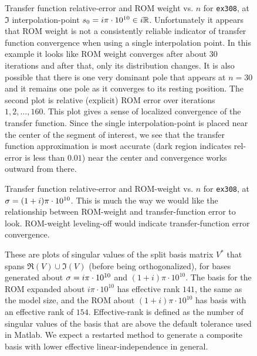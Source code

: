 \begin{figure}
\centering
{}
\caption{\label{fig:308benchmark2} Transfer function relative-error and ROM weight vs. $n$ for \texttt{ex308}, at $\Im$ interpolation-point $s_0 = i \pi\cdot10^{10}\in i \mathbb{R}$.   Unfortunately it appears that ROM weight is not
a consistently reliable indicator of transfer function convergence when using a single interpolation point.   In this example it looks like ROM weight converges after about 30 iterations and after that, only its distribution changes. It is also possible that there is one very dominant pole that appears at $n=30$ and it remains one pole as it converges to its resting position.
The second plot is relative (explicit) ROM error over iterations $1,2,\ldots,160$.  This plot gives a sense of localized convergence of the transfer function.  Since the single interpolation-point is placed near the center of the segment of interest, we see that the transfer function approximation is most accurate (dark region indicates rel-error is less than $0.01$) near the center and convergence works outward from there.}
\end{figure}

\begin{figure}
\caption{\label{fig:308benchmark3} Transfer function relative-error and ROM-weight vs. $n$ for \texttt{ex308}, at $\sigma = (1+i)\pi\cdot10^{10}$.   This is much the way we would like the relationship between ROM-weight and transfer-function error to look.    ROM-weight leveling-off would indicate transfer-function error convergence.}
\end{figure}


\begin{figure}
\centering
{}
\caption{ \label{fig:308singsvd}These are plots of singular values of the split basis matrix $V^*$ that spans  $\Re (V) \cup \Im (V) $ (before being orthogonalized), for bases generated about $\sigma=i\pi\cdot 10^{10}$ and $(1+i) \pi \cdot 10^{10}$.  The basis for the ROM expanded about $i \pi\cdot 10^{10}$ has effective rank $141$, the same as the model size,  and the ROM about  $(1+i)\pi\cdot 10^{10}$ has basis with an effective rank of $154$. Effective-rank is defined as the number of singular values of the basis that are above the default tolerance used in Matlab.  We expect a restarted method to generate a composite basis with lower effective linear-independence in general.}
\end{figure}
\clearpage

